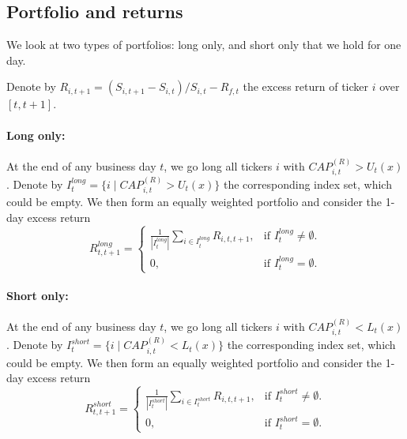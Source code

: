 %
%
%
%
% 


\subsection{Portfolio and returns}

We look at two types of portfolios: long only, and short only that we hold for one day.

Denote by $R_{i,t+1}=(S_{i,t+1}-S_{i,t})/S_{i,t} - R_{f,t}$ the excess return of ticker $i$ over $[t,t+1]$. 

\paragraph{Long only:}

At the end of any business day $t$, we go long all tickers $i$ with $CAP_{i,t}^{(R)} > U_t(x)$. Denote by $I^{long}_t=\{ i\mid CAP_{i,t}^{(R)} > U_t(x)\}$ the corresponding index set, which could be empty. We then form an equally weighted portfolio and consider the 1-day excess return
\[ R^{long}_{t,t+1} = \begin{cases} \frac{1}{|I^{long}_t|}\sum_{i\in I^{long}_t} R_{i,t,t+1} ,&\text{if $I^{long}_t\neq \emptyset$.} \\
0, &\text{if $I^{long}_t = \emptyset$.} \end{cases}\]


\paragraph{Short only:}

At the end of any business day $t$, we go long all tickers $i$ with $CAP_{i,t}^{(R)} < L_t(x)$. Denote by $I^{short}_t=\{ i\mid CAP_{i,t}^{(R)} < L_t(x)\}$ the corresponding index set, which could be empty. We then form an equally weighted portfolio and consider the 1-day excess return
\[ R^{short}_{t,t+1} = \begin{cases} \frac{1}{|I^{short}_t|}\sum_{i\in I^{short}_t} R_{i,t,t+1} ,&\text{if $I^{short}_t\neq \emptyset$.} \\
0, &\text{if $I^{short}_t = \emptyset$.} \end{cases}\]


